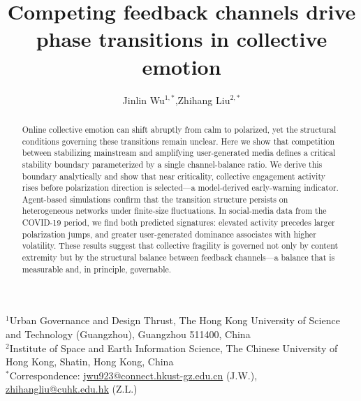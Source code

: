 \documentclass[12pt]{article}
\begin{document}
\doublespacing
\linenumbers

\title{\Large\textbf{Competing feedback channels drive phase transitions in collective emotion}}

\author{
  Jinlin Wu$^{1,*}$,\quad Zhihang Liu$^{2,*}$
}

\date{}
\maketitle

\begin{singlespace}
\noindent
{\small
$^{1}$Urban Governance and Design Thrust, The Hong Kong University of Science and Technology (Guangzhou), Guangzhou 511400, China\\[2pt]
$^{2}$Institute of Space and Earth Information Science, The Chinese University of Hong Kong, Shatin, Hong Kong, China\\[6pt]
$^{*}$Correspondence:\;
\href{mailto:jwu923@connect.hkust-gz.edu.cn}{jwu923@connect.hkust-gz.edu.cn} (J.W.),\;
\href{mailto:zhihangliu@cuhk.edu.hk}{zhihangliu@cuhk.edu.hk} (Z.L.)
}
\end{singlespace}

\vspace{1em}

\begin{abstract}
\noindent
Online collective emotion can shift abruptly from calm to polarized, yet the structural conditions governing these transitions remain unclear. Here we show that competition between stabilizing mainstream and amplifying user-generated media defines a critical stability boundary parameterized by a single channel-balance ratio. We derive this boundary analytically and show that near criticality, collective engagement activity rises before polarization direction is selected---a model-derived early-warning indicator. Agent-based simulations confirm that the transition structure persists on heterogeneous networks under finite-size fluctuations. In social-media data from the COVID-19 period, we find both predicted signatures: elevated activity precedes larger polarization jumps, and greater user-generated dominance associates with higher volatility. These results suggest that collective fragility is governed not only by content extremity but by the structural balance between feedback channels---a balance that is measurable and, in principle, governable.
\end{abstract}
\end{document}
